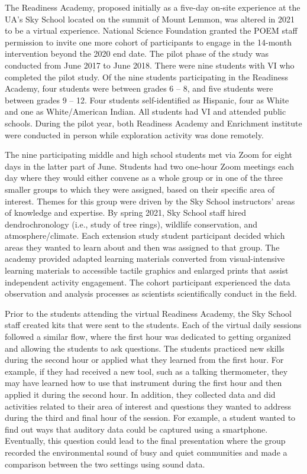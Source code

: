 \documentclass[11pt]{sig-alternate}
\begin{document}
\begin{large}
{The Readiness Academy, proposed initially as a five-day on-site experience at the UA’s Sky School located on the summit of Mount Lemmon, was altered in 2021 to be a virtual experience. National Science Foundation granted the POEM staff permission to invite one more cohort of participants to engage in the 14-month intervention beyond the 2020 end date. The pilot phase of the study was conducted from June 2017 to June 2018. There were nine students with VI who completed the pilot study. Of the nine students participating in the Readiness Academy, four students were between grades 6 – 8, and five students were between grades 9 – 12. Four students self-identified as Hispanic, four as White and one as White/American Indian. All students had VI and attended public schools. During the pilot year, both Readiness Academy and Enrichment institute were conducted in person while exploration activity was done remotely.

The nine participating middle and high school students met via Zoom for eight days in the latter part of June. Students had two one-hour Zoom meetings each day where they would either convene as a whole group or in one of the three smaller groups to which they were assigned, based on their specific area of interest. Themes for this group were driven by the Sky School instructors’ areas of knowledge and expertise. By spring 2021, Sky School staff hired dendrochronology (i.e., study of tree rings), wildlife conservation, and atmosphere/climate. Each extension study student participant decided which areas they wanted to learn about and then was assigned to that group. The academy provided adapted learning materials converted from visual-intensive learning materials to accessible tactile graphics and enlarged prints that assist independent activity engagement. The cohort participant experienced the data observation and analysis processes as scientists scientifically conduct in the field. 

Prior to the students attending the virtual Readiness Academy, the Sky School staff created kits that were sent to the students. Each of the virtual daily sessions followed a similar flow, where the first hour was dedicated to getting organized and allowing the students to ask questions. The students practiced new skills during the second hour or applied what they learned from the first hour. For example, if they had received a new tool, such as a talking thermometer, they may have learned how to use that instrument during the first hour and then applied it during the second hour. In addition, they collected data and did activities related to their area of interest and questions they wanted to address during the third and final hour of the session. For example, a student wanted to find out ways that auditory data could be captured using a smartphone. Eventually, this question could lead to the final presentation where the group recorded the environmental sound of busy and quiet communities and made a comparison between the two settings using sound data. 

}
\end{large}
\end{document}

